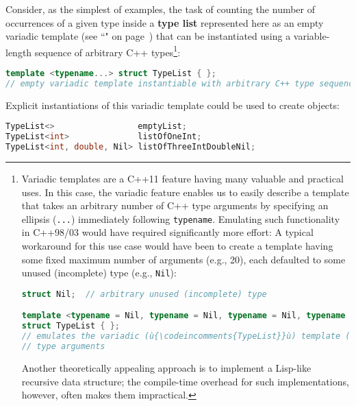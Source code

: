Consider, as the simplest of examples, the task of counting the number
of occurrences of a given type inside a \textbf{type list} represented
here as an empty variadic template (see ``" on page~\pageref{variadictemplate}) that can be
instantiated using a variable-length sequence of arbitrary C++ types{\cprotect\footnote{Variadic templates are a C++11
feature having many valuable and practical uses. In this case, the
variadic feature enables us to easily describe a template that takes
an arbitrary number of C++ type arguments by specifying an ellipsis
(\texttt{...}) immediately following \texttt{typename}. Emulating such
functionality in C++98/03 would have required significantly more
effort: A typical workaround for this use case would have been to
create a template having some fixed maximum number of arguments (e.g.,
20), each defaulted to some unused (incomplete) type (e.g.,
\texttt{Nil}):

\begin{lstlisting}[language=C++, basicstyle={\ttfamily\footnotesize}]
struct Nil;  // arbitrary unused (incomplete) type

template <typename = Nil, typename = Nil, typename = Nil, typename = Nil>
struct TypeList { };
// emulates the variadic (ù{\codeincomments{TypeList}}ù) template (ù{\codeincomments{struct}}ù) for up to four
// type arguments
\end{lstlisting}

\vspace*{-1ex}
\noindent Another theoretically appealing approach is to implement a Lisp-like
recursive data structure; the compile-time overhead for such
implementations, however, often makes them impractical.}}:

\begin{lstlisting}[language=C++]
template <typename...> struct TypeList { };
// empty variadic template instantiable with arbitrary C++ type sequence
\end{lstlisting}

\noindent Explicit instantiations of this variadic template could be used to
create objects:

\begin{lstlisting}[language=C++]
TypeList<>                 emptyList;
TypeList<int>              listOfOneInt;
TypeList<int, double, Nil> listOfThreeIntDoubleNil;
\end{lstlisting}

